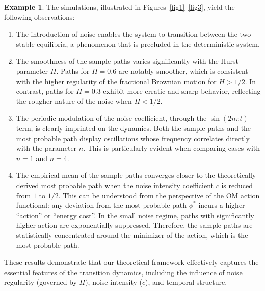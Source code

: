 \documentclass[preprint,12pt]{elsarticle}
\theoremstyle{definition}  %
\newtheorem{example}{Example}[section]
\theoremstyle{plain}  %
\begin{document}
\begin{example}
The simulations, illustrated in Figures~\ref{fig1}--\ref{fig3}, yield the following observations:
\begin{enumerate}
    \item The introduction of noise enables the system to transition between the two stable equilibria, a phenomenon that is precluded in the deterministic system.
    \item The smoothness of the sample paths varies significantly with the Hurst parameter $H$. Paths for $H=0.6$ are notably smoother, which is consistent with the higher regularity of the fractional Brownian motion for $H>1/2$. In contrast, paths for $H=0.3$ exhibit more erratic and sharp behavior, reflecting the rougher nature of the noise when $H<1/2$.
    \item The periodic modulation of the noise coefficient, through the $\sin(2n\pi t)$ term, is clearly imprinted on the dynamics. Both the sample paths and the most probable path display oscillations whose frequency correlates directly with the parameter $n$. This is particularly evident when comparing cases with $n=1$ and $n=4$.
    \item The empirical mean of the sample paths converges closer to the theoretically derived most probable path when the noise intensity coefficient $c$ is reduced from $1$ to $1/2$. This can be understood from the perspective of the OM action functional: any deviation from the most probable path $\phi^*$ incurs a higher ``action'' or ``energy cost''. In the small noise regime, paths with significantly higher action are exponentially suppressed. Therefore, the sample paths are statistically concentrated around the minimizer of the action, which is the most probable path.

\end{enumerate}
These results demonstrate that our theoretical framework effectively captures the essential features of the transition dynamics, including the influence of noise regularity (governed by $H$), noise intensity ($c$), and temporal structure.
\end{example}


 
 
\end{document}
